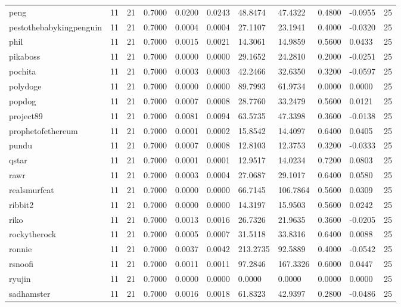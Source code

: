 \begin{table}[htbp]
\begin{tabular}{lllllllllll}
peng & 11 & 21 & 0.7000 & 0.0200 & 0.0243 & 48.8474 & 47.4322 & 0.4800 & -0.0955 & 25 \\
pestothebabykingpenguin & 11 & 21 & 0.7000 & 0.0004 & 0.0004 & 27.1107 & 23.1941 & 0.4000 & -0.0320 & 25 \\
phil & 11 & 21 & 0.7000 & 0.0015 & 0.0021 & 14.3061 & 14.9859 & 0.5600 & 0.0433 & 25 \\
pikaboss & 11 & 21 & 0.7000 & 0.0000 & 0.0000 & 29.1652 & 24.2810 & 0.2000 & -0.0251 & 25 \\
pochita & 11 & 21 & 0.7000 & 0.0003 & 0.0003 & 42.2466 & 32.6350 & 0.3200 & -0.0597 & 25 \\
polydoge & 11 & 21 & 0.7000 & 0.0000 & 0.0000 & 89.7993 & 61.9734 & 0.0000 & 0.0000 & 25 \\
popdog & 11 & 21 & 0.7000 & 0.0007 & 0.0008 & 28.7760 & 33.2479 & 0.5600 & 0.0121 & 25 \\
project89 & 11 & 21 & 0.7000 & 0.0081 & 0.0094 & 63.5735 & 47.3398 & 0.3600 & -0.0138 & 25 \\
prophetofethereum & 11 & 21 & 0.7000 & 0.0001 & 0.0002 & 15.8542 & 14.4097 & 0.6400 & 0.0405 & 25 \\
pundu & 11 & 21 & 0.7000 & 0.0007 & 0.0008 & 12.8103 & 12.3753 & 0.3200 & -0.0333 & 25 \\
qstar & 11 & 21 & 0.7000 & 0.0001 & 0.0001 & 12.9517 & 14.0234 & 0.7200 & 0.0803 & 25 \\
rawr & 11 & 21 & 0.7000 & 0.0003 & 0.0004 & 27.0687 & 29.1017 & 0.6400 & 0.0580 & 25 \\
realsmurfcat & 11 & 21 & 0.7000 & 0.0000 & 0.0000 & 66.7145 & 106.7864 & 0.5600 & 0.0309 & 25 \\
ribbit2 & 11 & 21 & 0.7000 & 0.0000 & 0.0000 & 14.3197 & 15.9503 & 0.5600 & 0.0242 & 25 \\
riko & 11 & 21 & 0.7000 & 0.0013 & 0.0016 & 26.7326 & 21.9635 & 0.3600 & -0.0205 & 25 \\
rockytherock & 11 & 21 & 0.7000 & 0.0005 & 0.0007 & 31.5118 & 33.8316 & 0.6400 & 0.0088 & 25 \\
ronnie & 11 & 21 & 0.7000 & 0.0037 & 0.0042 & 213.2735 & 92.5889 & 0.4000 & -0.0542 & 25 \\
rsnoofi & 11 & 21 & 0.7000 & 0.0011 & 0.0011 & 97.2846 & 167.3326 & 0.6000 & 0.0447 & 25 \\
ryujin & 11 & 21 & 0.7000 & 0.0000 & 0.0000 & 0.0000 & 0.0000 & 0.0000 & 0.0000 & 25 \\
sadhamster & 11 & 21 & 0.7000 & 0.0016 & 0.0018 & 61.8323 & 42.9397 & 0.2800 & -0.0486 & 25 \\

\end{tabular}
\end{table}
